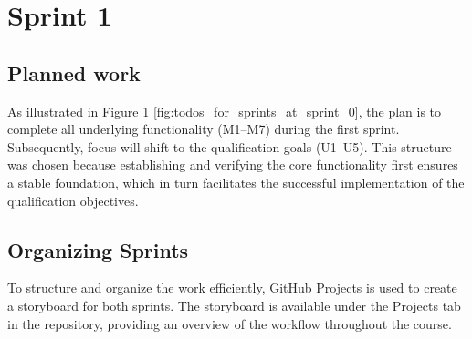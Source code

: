 \section{Sprint 1}

\subsection{Planned work}

As illustrated in Figure 1 \ref{fig:todos_for_sprints_at_sprint_0}, the plan is to complete all underlying functionality (M1–M7) during the first sprint. 
Subsequently, focus will shift to the qualification goals (U1–U5). This structure was chosen because establishing and verifying the core functionality 
first ensures a stable foundation, which in turn facilitates the successful implementation of the qualification objectives.

\subsection{Organizing Sprints}

To structure and organize the work efficiently, GitHub Projects is used to create a storyboard for both sprints. The storyboard is available under the 
Projects tab in the repository, providing an overview of the workflow throughout the course.